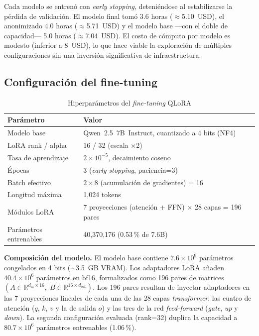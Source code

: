 \documentclass[10pt,twocolumn]{article}
\begin{document}
Cada modelo se entren\'o con \textit{early stopping}, deteni\'endose al estabilizarse la p\'erdida de validaci\'on. El modelo final tom\'o 3.6 horas ($\approx$5.10~USD), el anonimizado 4.0 horas ($\approx$5.71~USD) y el modelo base ---con el doble de capacidad--- 5.0 horas ($\approx$7.04~USD). El costo de c\'omputo por modelo es modesto (inferior a 8~USD), lo que hace viable la exploraci\'on de m\'ultiples configuraciones sin una inversi\'on significativa de infraestructura.

\subsection{Configuraci\'on del fine-tuning}
\label{sec:f:config}

\begin{table}[H]
\centering
\caption{Hiperpar\'ametros del \textit{fine-tuning} QLoRA}
\label{tab:hyperparams}
\footnotesize
\begin{tabularx}{\columnwidth}{lX}
\toprule
\textbf{Par\'ametro} & \textbf{Valor} \\
\midrule
Modelo base & Qwen~2.5~7B~Instruct, cuantizado a 4 bits (NF4) \\
LoRA rank / alpha & 16 / 32 (escala $\times$2) \\
Tasa de aprendizaje & $2\times10^{-5}$, decaimiento coseno \\
\'Epocas & 3 (\textit{early stopping}, paciencia=3) \\
Batch efectivo & $2 \times 8$ (acumulaci\'on de gradientes) = 16 \\
Longitud m\'axima & 1,024 tokens \\
M\'odulos LoRA & 7 proyecciones (atenci\'on + FFN) $\times$ 28 capas = 196 pares \\
Par\'ametros entrenables & 40,370,176 (0.53\,\% de 7.6B) \\
\bottomrule
\end{tabularx}
\end{table}

\textbf{Composici\'on del modelo.} El modelo base contiene $7.6 \times 10^9$ par\'ametros congelados en 4 bits ($\sim$3.5~GB VRAM). Los adaptadores LoRA a\~naden $40.4 \times 10^6$ par\'ametros en bf16, formalizados como 196 pares de matrices $(A \in \mathbb{R}^{d_{\text{in}} \times 16},\; B \in \mathbb{R}^{16 \times d_{\text{out}}})$. Los 196 pares resultan de inyectar adaptadores en las 7 proyecciones lineales de cada una de las 28 capas \textit{transformer}: las cuatro de atenci\'on ($q$, $k$, $v$ y la de salida $o$) y las tres de la red \textit{feed-forward} (\textit{gate}, \textit{up} y \textit{down}). La segunda configuraci\'on evaluada (rank=32) duplica la capacidad a $80.7 \times 10^6$ par\'ametros entrenables (1.06\,\%).
\end{document}

